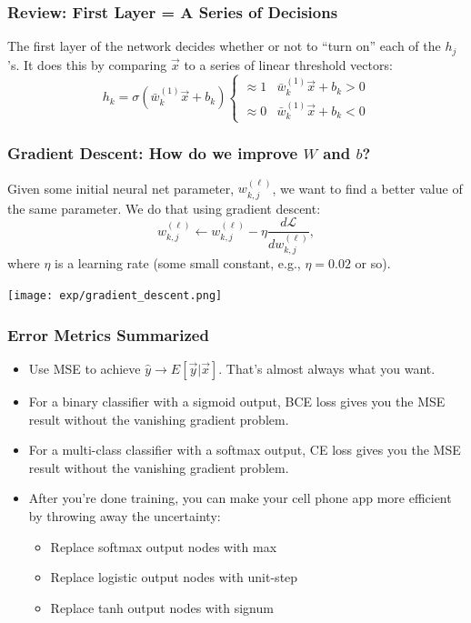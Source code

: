 \documentclass{beamer}
\begin{document}
\begin{frame}
  \frametitle{Review: First Layer = A Series of Decisions}

  The first layer of the network decides whether or not to ``turn on'' each of the
  $h_j$'s.  It does this by comparing $\vec{x}$ to a series of linear threshold vectors:
  \[
  h_k = \sigma\left(\bar{w}_k^{(1)}\vec{x}+b_k\right)\begin{cases}
  \approx 1 & \bar{w}_k^{(1)}\vec{x} +b_k > 0\\
  \approx 0 & \bar{w}_k^{(1)}\vec{x} +b_k < 0
  \end{cases}
  \]
\end{frame}

\begin{frame}
  \frametitle{Gradient Descent: How do we improve $W$ and $b$?}  Given
  some initial neural net parameter, $w_{k,j}^{(\ell)}$, we want to
  find a better value of the same parameter.  We do that using
  gradient descent:
  \[
  w_{k,j}^{(\ell)} \leftarrow w_{k,j}^{(\ell)}-\eta\frac{d{\mathcal L}}{dw_{k,j}^{(\ell)}},
  \]
  where $\eta$ is a learning rate (some small constant, e.g., $\eta=0.02$ or so).
  \centerline{\texttt{[image: exp/gradient\_descent.png]}}
\end{frame}

\begin{frame}
  \frametitle{Error Metrics Summarized}
  \begin{itemize}
    \item Use MSE to achieve $\hat{y}\rightarrow
      E\left[\vec{y}|\vec{x}\right]$.  That's almost always what you
      want.
    \item For a binary classifier with a sigmoid output, BCE loss gives you
      the MSE result without the vanishing gradient problem.
    \item For a multi-class classifier with a softmax output, CE loss gives you
      the MSE result without the vanishing gradient problem.
    \item After you're done training, you can make your cell phone app
      more efficient by throwing away the uncertainty:
      \begin{itemize}
      \item Replace softmax output nodes with max
      \item Replace logistic output nodes with unit-step
      \item Replace tanh output nodes with signum
      \end{itemize}
  \end{itemize}
\end{frame}
\end{document}
